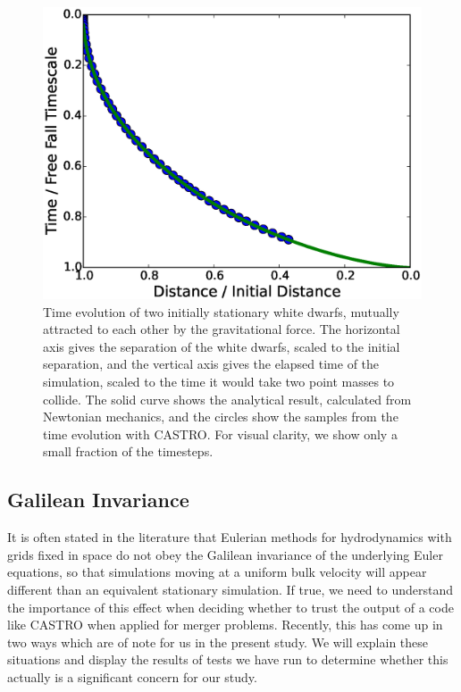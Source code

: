 \documentclass[iop]{../emulateapj}
\begin{document}
\begin{figure}
  \centering
  \includegraphics[scale=0.45]{plots/freefall}
  \caption{Time evolution of two initially stationary white dwarfs,
    mutually attracted to each other by the gravitational force. The
    horizontal axis gives the separation of the white dwarfs, scaled
    to the initial separation, and the vertical axis gives the elapsed
    time of the simulation, scaled to the time it would take two point masses
    to collide. The solid curve shows the analytical result,
    calculated from Newtonian mechanics, and the circles show the
    samples from the time evolution with CASTRO. For visual clarity, we 
    show only a small fraction of the timesteps.}
  \label{fig:freefall}
\end{figure}

\subsection{Galilean Invariance}\label{sec:galileo}

It is often stated in the literature that Eulerian methods for
hydrodynamics with grids fixed in space do not obey the Galilean
invariance of the underlying Euler equations, so that simulations
moving at a uniform bulk velocity will appear different than an
equivalent stationary simulation. If true, we need to understand 
the importance of this effect when deciding whether to trust the 
output of a code like CASTRO when applied for merger problems.
Recently, this has come up in two ways which are of note for us 
in the present study. We will explain these situations and display 
the results of tests we have run to determine whether this 
actually is a significant concern for our study.
\end{document}
